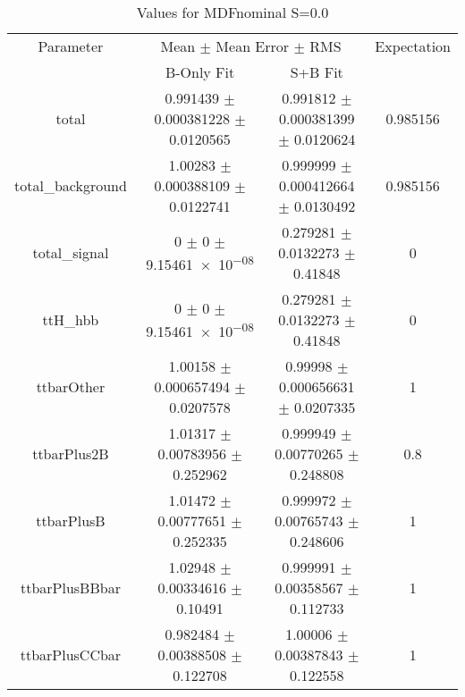 \begin{table}
\centering
\caption{Values for MDFnominal S=0.0}
\begin{tabular}{cccc}
\toprule
Parameter & \multicolumn{2}{c}{Mean $\pm$ Mean Error $\pm$ RMS} & Expectation\\
 & B-Only Fit & S+B Fit & \\
\midrule
total & \num{0.991439} $\pm$ \num{0.000381228} $\pm$ \num{0.0120565} & \num{0.991812} $\pm$ \num{0.000381399} $\pm$ \num{0.0120624} & \num{0.985156}\\
total\_background & \num{1.00283} $\pm$ \num{0.000388109} $\pm$ \num{0.0122741} & \num{0.999999} $\pm$ \num{0.000412664} $\pm$ \num{0.0130492} & \num{0.985156}\\
total\_signal & \num{0} $\pm$ \num{0} $\pm$ \num{9.15461e-08} & \num{0.279281} $\pm$ \num{0.0132273} $\pm$ \num{0.41848} & \num{0}\\
ttH\_hbb & \num{0} $\pm$ \num{0} $\pm$ \num{9.15461e-08} & \num{0.279281} $\pm$ \num{0.0132273} $\pm$ \num{0.41848} & \num{0}\\
ttbarOther & \num{1.00158} $\pm$ \num{0.000657494} $\pm$ \num{0.0207578} & \num{0.99998} $\pm$ \num{0.000656631} $\pm$ \num{0.0207335} & \num{1}\\
ttbarPlus2B & \num{1.01317} $\pm$ \num{0.00783956} $\pm$ \num{0.252962} & \num{0.999949} $\pm$ \num{0.00770265} $\pm$ \num{0.248808} & \num{0.8}\\
ttbarPlusB & \num{1.01472} $\pm$ \num{0.00777651} $\pm$ \num{0.252335} & \num{0.999972} $\pm$ \num{0.00765743} $\pm$ \num{0.248606} & \num{1}\\
ttbarPlusBBbar & \num{1.02948} $\pm$ \num{0.00334616} $\pm$ \num{0.10491} & \num{0.999991} $\pm$ \num{0.00358567} $\pm$ \num{0.112733} & \num{1}\\
ttbarPlusCCbar & \num{0.982484} $\pm$ \num{0.00388508} $\pm$ \num{0.122708} & \num{1.00006} $\pm$ \num{0.00387843} $\pm$ \num{0.122558} & \num{1}\\
\bottomrule
\end{tabular}
\end{table}